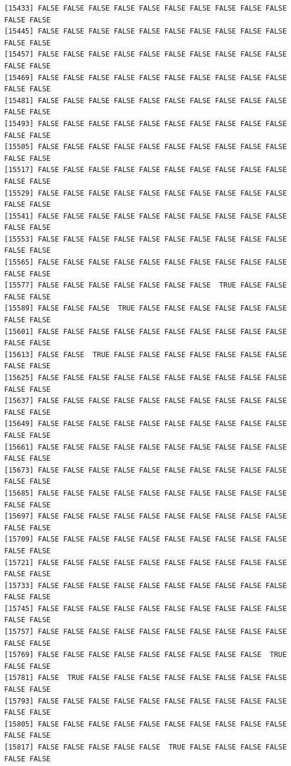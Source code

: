 \documentclass[
  a4paper,
  DIV=11,
  numbers=noendperiod]{scrartcl}
\begin{document}
\begin{verbatim}
[15433] FALSE FALSE FALSE FALSE FALSE FALSE FALSE FALSE FALSE FALSE FALSE FALSE
[15445] FALSE FALSE FALSE FALSE FALSE FALSE FALSE FALSE FALSE FALSE FALSE FALSE
[15457] FALSE FALSE FALSE FALSE FALSE FALSE FALSE FALSE FALSE FALSE FALSE FALSE
[15469] FALSE FALSE FALSE FALSE FALSE FALSE FALSE FALSE FALSE FALSE FALSE FALSE
[15481] FALSE FALSE FALSE FALSE FALSE FALSE FALSE FALSE FALSE FALSE FALSE FALSE
[15493] FALSE FALSE FALSE FALSE FALSE FALSE FALSE FALSE FALSE FALSE FALSE FALSE
[15505] FALSE FALSE FALSE FALSE FALSE FALSE FALSE FALSE FALSE FALSE FALSE FALSE
[15517] FALSE FALSE FALSE FALSE FALSE FALSE FALSE FALSE FALSE FALSE FALSE FALSE
[15529] FALSE FALSE FALSE FALSE FALSE FALSE FALSE FALSE FALSE FALSE FALSE FALSE
[15541] FALSE FALSE FALSE FALSE FALSE FALSE FALSE FALSE FALSE FALSE FALSE FALSE
[15553] FALSE FALSE FALSE FALSE FALSE FALSE FALSE FALSE FALSE FALSE FALSE FALSE
[15565] FALSE FALSE FALSE FALSE FALSE FALSE FALSE FALSE FALSE FALSE FALSE FALSE
[15577] FALSE FALSE FALSE FALSE FALSE FALSE FALSE  TRUE FALSE FALSE FALSE FALSE
[15589] FALSE FALSE FALSE  TRUE FALSE FALSE FALSE FALSE FALSE FALSE FALSE FALSE
[15601] FALSE FALSE FALSE FALSE FALSE FALSE FALSE FALSE FALSE FALSE FALSE FALSE
[15613] FALSE FALSE  TRUE FALSE FALSE FALSE FALSE FALSE FALSE FALSE FALSE FALSE
[15625] FALSE FALSE FALSE FALSE FALSE FALSE FALSE FALSE FALSE FALSE FALSE FALSE
[15637] FALSE FALSE FALSE FALSE FALSE FALSE FALSE FALSE FALSE FALSE FALSE FALSE
[15649] FALSE FALSE FALSE FALSE FALSE FALSE FALSE FALSE FALSE FALSE FALSE FALSE
[15661] FALSE FALSE FALSE FALSE FALSE FALSE FALSE FALSE FALSE FALSE FALSE FALSE
[15673] FALSE FALSE FALSE FALSE FALSE FALSE FALSE FALSE FALSE FALSE FALSE FALSE
[15685] FALSE FALSE FALSE FALSE FALSE FALSE FALSE FALSE FALSE FALSE FALSE FALSE
[15697] FALSE FALSE FALSE FALSE FALSE FALSE FALSE FALSE FALSE FALSE FALSE FALSE
[15709] FALSE FALSE FALSE FALSE FALSE FALSE FALSE FALSE FALSE FALSE FALSE FALSE
[15721] FALSE FALSE FALSE FALSE FALSE FALSE FALSE FALSE FALSE FALSE FALSE FALSE
[15733] FALSE FALSE FALSE FALSE FALSE FALSE FALSE FALSE FALSE FALSE FALSE FALSE
[15745] FALSE FALSE FALSE FALSE FALSE FALSE FALSE FALSE FALSE FALSE FALSE FALSE
[15757] FALSE FALSE FALSE FALSE FALSE FALSE FALSE FALSE FALSE FALSE FALSE FALSE
[15769] FALSE FALSE FALSE FALSE FALSE FALSE FALSE FALSE FALSE  TRUE FALSE FALSE
[15781] FALSE  TRUE FALSE FALSE FALSE FALSE FALSE FALSE FALSE FALSE FALSE FALSE
[15793] FALSE FALSE FALSE FALSE FALSE FALSE FALSE FALSE FALSE FALSE FALSE FALSE
[15805] FALSE FALSE FALSE FALSE FALSE FALSE FALSE FALSE FALSE FALSE FALSE FALSE
[15817] FALSE FALSE FALSE FALSE FALSE  TRUE FALSE FALSE FALSE FALSE FALSE FALSE

\end{verbatim}
\end{document}
